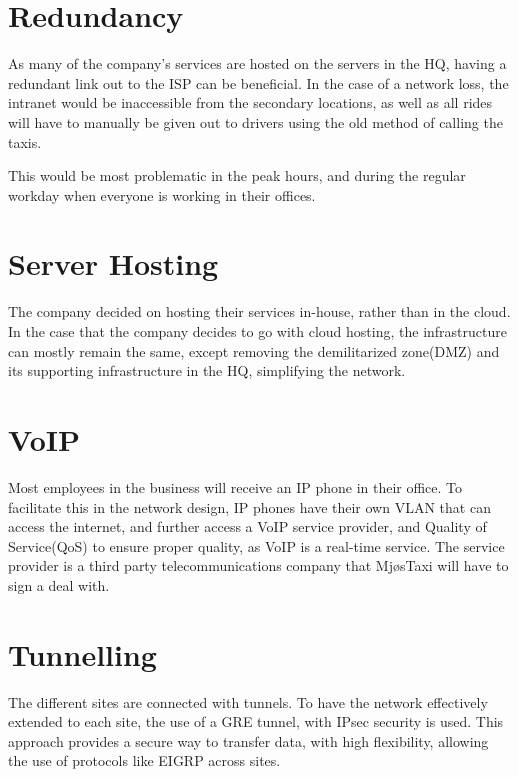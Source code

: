 \section{Redundancy}
As many of the company's services are hosted on the servers in the HQ, having a redundant link out to the ISP can be beneficial.
In the case of a network loss, the intranet would be inaccessible from the secondary locations, as well as all rides will have to manually be given out to drivers using the old method of calling the taxis.

This would be most problematic in the peak hours, and during the regular workday when everyone is working in their offices.

\section{Server Hosting}
The company decided on hosting their services in-house, rather than in the cloud.
In the case that the company decides to go with cloud hosting, the infrastructure can mostly remain the same, except removing the demilitarized zone(DMZ) and its supporting infrastructure in the HQ, simplifying the network.



\section{VoIP}
Most employees in the business will receive an IP phone in their office.
To facilitate this in the network design, IP phones have their own VLAN that can access the internet, and further access a VoIP service provider, and Quality of Service(QoS) to ensure proper quality, as VoIP is a real-time service. 
The service provider is a third party telecommunications company that MjøsTaxi will have to sign a deal with.

\section{Tunnelling}
The different sites are connected with tunnels.
To have the network effectively extended to each site, the use of a GRE tunnel, with IPsec security is used.
This approach provides a secure way to transfer data, with high flexibility, allowing the use of protocols like EIGRP across sites.